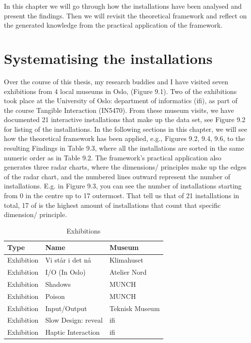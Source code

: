 In this chapter we will go through how the installations have been analysed and present the findings.  Then we will revisit the theoretical framework and reflect on the generated knowledge from the practical application of the framework.

\section{Systematising the installations}
Over the course of this thesis, my research buddies and I have visited seven exhibitions from 4 local museums in Oslo, (Figure 9.1). Two of the exhibitions took place at the University of Oslo: department of informatics (ifi), as part of the course Tangible Interaction (IN5470). From these museum visits, we have documented 21 interactive installations that make up the data set, see Figure 9.2 for listing of the installations. In the following sections in this chapter, we will see how the theoretical framework has been applied, e.g., Figures 9.2, 9.4, 9.6, to the resulting Findings in Table 9.3, where all the installations are sorted in the same numeric order as in Table 9.2. The framework's practical application also generates three radar charts, where the dimensions/ principles make up the edges of the radar chart, and the numbered lines outward represent the number of installations. E.g. in Figure 9.3, you can see the number of installations starting from 0 in the centre up to 17 outermost. That tell us that of 21 installations in total, 17 of is the highest amount of installations that count that specific dimension/ principle.

\begin{table}[H]
\centering
\begin{tabular}{| l | l| l|}
\hline
\textbf{Type} & \textbf{Name} & \textbf{Museum}\\
\hline
Exhibition & Vi står i det nå & Klimahuset \\
Exhibition & I/O (In Oslo) & Atelier Nord\\
Exhibition & Shadows & MUNCH\\
Exhibition & Poison & MUNCH \\
Exhibition & Input/Output & Teknisk Museum \\
Exhibition & Slow Design: reveal & ifi \\
Exhibition & Haptic Interaction & ifi \\
\hline
\end{tabular}
\caption{Exhibitions}
\label{tab:abc}
\end{table}

